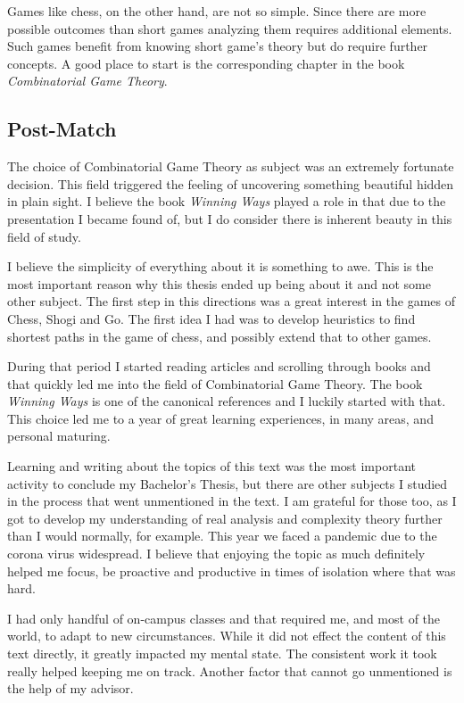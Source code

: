 Games like chess, on the other hand, are not so simple. Since there are more possible outcomes than short games analyzing them requires additional elements. Such games benefit from knowing short game's theory but do require further concepts. A good place to start is the corresponding chapter in the book \textit{Combinatorial Game Theory}.


\subsection*{Post-Match}

The choice of Combinatorial Game Theory as subject was an extremely fortunate decision. This field triggered the feeling of uncovering something beautiful hidden in plain sight. I believe the book \textit{Winning Ways} played a role in that due to the presentation I became found of, but I do consider there is inherent beauty in this field of study.

I believe the simplicity of everything about it is something to awe. This is the most important reason why this thesis ended up being about it and not some other subject. The first step in this directions was a great interest in the games of Chess, Shogi and Go. The first idea I had was to develop heuristics to find shortest paths in the game of chess, and possibly extend that to other games.

During that period I started reading articles and scrolling through books and that quickly led me into the field of Combinatorial Game Theory. The book \textit{Winning Ways} is one of the canonical references and I luckily started with that. This choice led me to a year of great learning experiences, in many areas, and personal maturing.

Learning and writing about the topics of this text was the most important activity to conclude my Bachelor's Thesis, but there are other subjects I studied in the process that went unmentioned in the text. I am grateful for those too, as I got to develop my understanding of real analysis and complexity theory further than I would normally, for example. This year we faced a pandemic due to the corona virus widespread. I believe that enjoying the topic as much definitely helped me focus, be proactive and productive in times of isolation where that was hard. 

I had only handful of on-campus classes and that required me, and most of the world, to adapt to new circumstances. While it did not effect the content of this text directly, it greatly impacted my mental state. The consistent work it took really helped keeping me on track. Another factor that cannot go unmentioned is the help of my advisor.

